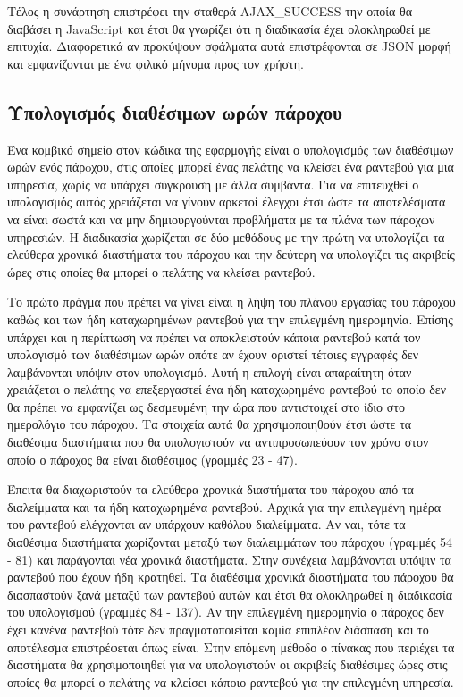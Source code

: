 Τέλος η συνάρτηση επιστρέφει την σταθερά AJAX\_SUCCESS την οποία θα διαβάσει η JavaScript και έτσι θα γνωρίζει ότι η διαδικασία έχει ολοκληρωθεί με επιτυχία. Διαφορετικά αν προκύψουν σφάλματα αυτά επιστρέφονται σε JSON μορφή και εμφανίζονται με ένα φιλικό μήνυμα προς τον χρήστη.

\subsection{Υπολογισμός διαθέσιμων ωρών πάροχου}
Ένα κομβικό σημείο στον κώδικα της εφαρμογής είναι ο υπολογισμός των διαθέσιμων ωρών ενός πάρoχου, στις οποίες μπορεί ένας πελάτης να κλείσει ένα ραντεβού για μια υπηρεσία, χωρίς να υπάρχει σύγκρουση με άλλα συμβάντα. Για να επιτευχθεί ο υπολογισμός αυτός χρειάζεται να γίνουν αρκετοί έλεγχοι έτσι ώστε τα αποτελέσματα να είναι σωστά και να μην δημιουργούνται προβλήματα με τα πλάνα των πάροχων υπηρεσιών. Η διαδικασία χωρίζεται σε δύο μεθόδους με την πρώτη να υπολογίζει τα ελεύθερα χρονικά διαστήματα του πάροχου και την δεύτερη να υπολογίζει τις ακριβείς ώρες στις οποίες θα μπορεί ο πελάτης να κλείσει ραντεβού.



Το πρώτο πράγμα που πρέπει να γίνει είναι η λήψη του πλάνου εργασίας του πάροχου καθώς και των ήδη καταχωρημένων ραντεβού για την επιλεγμένη ημερομηνία. Επίσης υπάρχει και η περίπτωση να πρέπει να αποκλειστούν κάποια ραντεβού κατά τον υπολογισμό των διαθέσιμων ωρών οπότε αν έχουν οριστεί τέτοιες εγγραφές δεν λαμβάνονται υπόψιν στον υπολογισμό. Αυτή η επιλογή είναι απαραίτητη όταν χρειάζεται ο πελάτης να επεξεργαστεί ένα ήδη καταχωρημένο ραντεβού το οποίο δεν θα πρέπει να εμφανίζει ως δεσμευμένη την ώρα που αντιστοιχεί στο ίδιο στο ημερολόγιο του πάροχου. Τα στοιχεία αυτά θα χρησιμοποιηθούν έτσι ώστε τα διαθέσιμα διαστήματα που θα υπολογιστούν να αντιπροσωπεύουν τον χρόνο στον οποίο ο πάροχος θα είναι διαθέσιμος (γραμμές 23 - 47).

Έπειτα θα διαχωριστούν τα ελεύθερα χρονικά διαστήματα του πάροχου από τα διαλείμματα και τα ήδη καταχωρημένα ραντεβού. Αρχικά για την επιλεγμένη ημέρα του ραντεβού ελέγχονται αν υπάρχουν καθόλου διαλείμματα. Αν ναι, τότε τα διαθέσιμα διαστήματα χωρίζονται μεταξύ των διαλειμμάτων του πάροχου (γραμμές 54 - 81) και παράγονται νέα χρονικά διαστήματα. Στην συνέχεια λαμβάνονται υπόψιν τα ραντεβού που έχουν ήδη κρατηθεί. Τα διαθέσιμα χρονικά διαστήματα του πάροχου θα διασπαστούν ξανά μεταξύ των ραντεβού αυτών και έτσι θα ολοκληρωθεί η διαδικασία του υπολογισμού (γραμμές 84 - 137). Αν την επιλεγμένη ημερομηνία ο πάροχος δεν έχει κανένα ραντεβού τότε δεν πραγματοποιείται καμία επιπλέον διάσπαση και το αποτέλεσμα επιστρέφεται όπως είναι. Στην επόμενη μέθοδο ο πίνακας που περιέχει τα διαστήματα θα χρησιμοποιηθεί για να υπολογιστούν οι ακριβείς διαθέσιμες ώρες στις οποίες θα μπορεί ο πελάτης να κλείσει κάποιο ραντεβού για την επιλεγμένη υπηρεσία.


